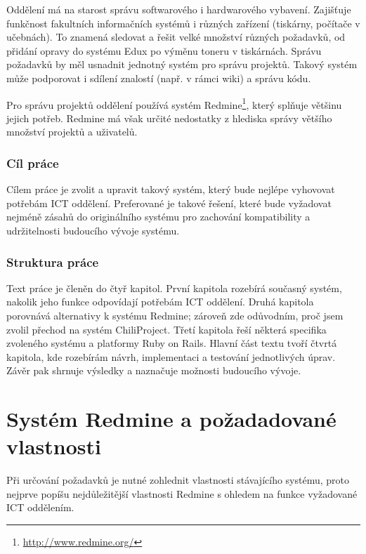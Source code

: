 \documentclass[thesis=B,czech]{FITthesis}[2012/05/02]
\begin{document}
\begin{introduction}

Oddělení   má na starost správu softwarového i hardwarového vybavení. Zajišťuje funkčnost fakultních informačních systémů i různých zařízení (tiskárny, počítače v učebnách). To znamená sledovat a řešit velké množství různých požadavků, od přidání opravy do systému Edux po výměnu toneru v tiskárnách. Správu požadavků by měl usnadnit jednotný systém pro správu projektů. Takový systém může podporovat i sdílení znalostí (např. v rámci \gls{wiki}) a správu kódu.

Pro správu projektů oddělení používá systém Redmine\footnote{\url{http://www.redmine.org/}}, který splňuje většinu jejich potřeb. Redmine má však určité nedostatky z hlediska správy většího množství projektů a uživatelů.

\subsection{Cíl práce}

Cílem práce je zvolit a upravit takový systém, který bude nejlépe vyhovovat potřebám ICT oddělení. Preferované je takové řešení, které bude vyžadovat nejméně zásahů do originálního systému pro zachování kompatibility a udržitelnosti budoucího vývoje systému.

\subsection{Struktura práce}

Text práce je členěn do čtyř kapitol. První kapitola rozebírá současný systém, nakolik jeho funkce odpovídají potřebám ICT oddělení. Druhá kapitola porovnává alternativy k systému Redmine; zároveň zde odůvodním, proč jsem zvolil přechod na systém ChiliProject. Třetí kapitola řeší některá specifika zvoleného systému a platformy Ruby on Rails. Hlavní část textu tvoří čtvrtá kapitola, kde rozebírám návrh, implementaci a testování jednotlivých úprav. Závěr pak shrnuje výsledky a naznačuje možnosti budoucího vývoje.

\end{introduction}

\chapter{Systém Redmine a požadadované vlastnosti}

Při určování požadavků je nutné zohlednit vlastnosti stávajícího
systému, proto nejprve popíšu nejdůležitější vlastnosti Redmine
s ohledem na funkce vyžadované ICT oddělením.
\end{document}
